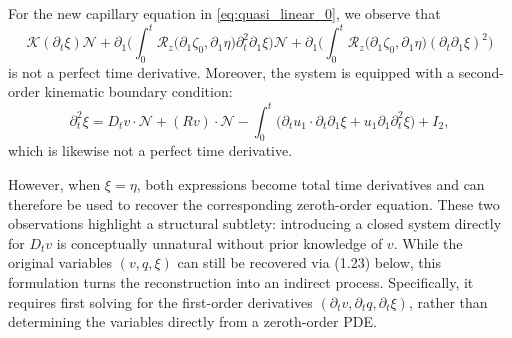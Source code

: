 \documentclass[letterpaper,reqno,10pt,twoside]{amsart}
\newcommand{\red}[1]{{\color{red}{#1}}}
\newcommand{\blue}[1]{{\color{blue}{#1}}}
\theoremstyle{definition}
\theoremstyle{remark}
\def\p{\partial}
\begin{document}
	
	For the new capillary equation in \eqref{eq:quasi_linear_0}, we observe that
	\[
	\mathcal{K}(\partial_{t}\xi)\mathcal{N}
	+\partial_{1}\Big(\int_{0}^{t}\mathcal{R}_{z}\Big(\partial_{1}\zeta_{0},\partial_{1}\eta\Big)\partial_{t}^{2}\partial_{1}\xi\Big)\mathcal{N}
	+\partial_{1}\Big(\int_{0}^{t}\mathcal{R}_{z}\Big(\partial_{1}\zeta_{0},\partial_{1}\eta\Big)(\partial_{t}\partial_{1}\xi)^{2}\Big)
	\]
	is not a perfect time derivative. Moreover, the system is equipped with a second-order kinematic boundary condition:
	\[
	\partial_{t}^{2}\xi
	= D_{t}v\cdot \mathcal{N}+(Rv)\cdot \mathcal{N}-\int_{0}^{t}\Big(\partial_{t}u_{1}\cdot\partial_{t}\partial_{1}\xi+u_{1}\partial_{1}\partial_{t}^{2}\xi\Big)+I_{2},
	\]
	which is likewise not a perfect time derivative.
	
	However, when $\xi=\eta$, both expressions become total time derivatives and can therefore be used to recover the corresponding zeroth-order equation. These two observations highlight a structural subtlety: introducing a closed system directly for $D_t v$ is conceptually unnatural without prior knowledge of $v$. While the original variables $(v, q, \xi)$ can still be recovered via (1.23) below, this formulation turns the reconstruction into an indirect process. Specifically, it requires first solving for the first-order derivatives $(\p_t v, \p_t q, \p_t \xi)$, rather than determining the variables directly from a zeroth-order PDE.
	
\end{document}
